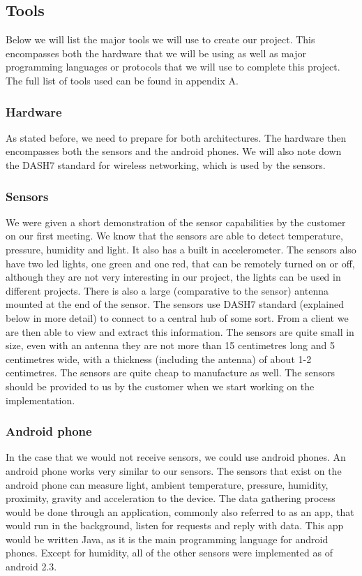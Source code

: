 \documentclass[../document]{subfiles}
\begin{document}
\subsection{Tools}
Below we will list the major tools we will use to create our project. This encompasses both the hardware that we will be using as well as major programming languages or protocols that we will use to complete this project. The full list of tools used can be found in appendix A.

\subsubsection{Hardware}
As stated before, we need to prepare for both architectures. The hardware then encompasses both the sensors and the android phones. We will also note down the DASH7 standard for wireless networking, which is used by the sensors.

\subsubsection{Sensors}
We were given a short demonstration of the sensor capabilities by the customer on our first meeting. We know that the sensors are able to detect temperature, pressure, humidity and light. It also has a built in accelerometer. The sensors also have two led lights, one green and one red, that can be remotely turned on or off, although they are not very interesting in our project, the lights can be used in different projects. There is also a large (comparative to the sensor) antenna mounted at the end of the sensor. The sensors use DASH7 standard (explained below in more detail) to connect to a central hub of some sort. From a client we are then able to view and extract this information. The sensors are quite small in size, even with an antenna they are not more than 15 centimetres long and 5 centimetres wide, with a thickness (including the antenna) of about 1-2 centimetres. The sensors are quite cheap to manufacture as well. The sensors should be provided to us by the customer when we start working on the implementation.

\subsubsection{Android phone}
In the case that we would not receive sensors, we could use android phones. An android phone works very similar to our sensors. The sensors that exist on the android phone can measure light, ambient temperature, pressure, humidity, proximity, gravity and acceleration to the device. The data gathering process would be done through an application, commonly also referred to as an app, that would run in the background, listen for requests and reply with data. This app would be written Java, as it is the main programming language for android phones. Except for humidity, all of the other sensors were implemented as of android 2.3.
\end{document}
